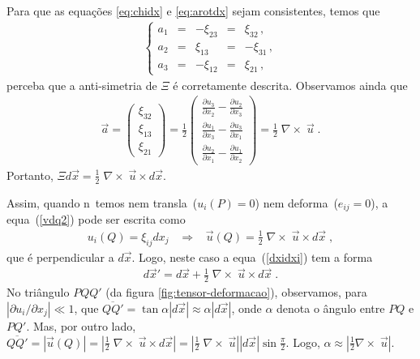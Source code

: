 Para que as equa\c{c}\~oes \ref{eq:chidx} e \ref{eq:arotdx} sejam consistentes, temos que
\begin{eqnarray}
\left\{
\begin{array}{ccccc}
a_1 & = & -\xi_{23} & = & \xi_{32} \, , \\
a_2 & = & \xi_{13} & = & -\xi_{31}\, ,  \\
a_3 & = & -\xi_{12} & = & \xi_{21} \, ,
\end{array} \right.
\end{eqnarray}
perceba que a anti-simetria de $\Xi$ \'e corretamente descrita.
Observamos ainda que
\begin{eqnarray}
\vec{a} = \left(
\begin{array}{c}
\xi_{32} \\
\xi_{13} \\
\xi_{21}
\end{array} \right)
= \frac{1}{2}  \left(
\begin{array}{c}
\frac{\partial u_3}{\partial x_2}-\frac{\partial u_2}
{\partial x_3}\\
\frac{\partial u_1}{\partial x_3}-\frac{\partial u_3}
{\partial x_1}\\
\frac{\partial u_2}{\partial x_1}-\frac{\partial u_1}
{\partial x_2}
\end{array} \right)
= \frac{1}{2} \; \nabla \times \; \vec{u} \; .
\end{eqnarray}
Portanto, $\Xi d\vec{x} = \frac{1}{2} \; \nabla \times
\;\vec{u} \times d\vec{x}$.

Assim, quando n\ao\ temos nem transla\cao\ ($u_i(P)=0$) nem deforma\cao\
($e_{ij}=0$), a equa\cao\ (\ref{vdq2}) pode ser escrita como
\begin{eqnarray}
u_i(Q) = \xi_{ij} dx_j \; \; \; \Longrightarrow \; \; \;
\vec{u}(Q) = \frac{1}{2} \;\nabla \times \; \vec{u}\times
d\vec{x} \; ,
\end{eqnarray}
que \'e perpendicular a $d\vec{x}$.
Logo, neste caso a equa\cao\ (\ref{dxidxi})
tem a forma
\begin{eqnarray}
  d\vec{x}' = d\vec{x} + \frac{1}{2} \;\nabla \times \; \vec{u}\times
d\vec{x} \; .
\end{eqnarray}
No tri\^angulo $PQQ'$ (da figura \ref{fig:tensor-deformacao}), observamos, para $|\partial u_i/\partial x_j|\ll 1$,
que $\overline{QQ'} = \tan \alpha |d\vec{x}| \approx
\alpha |d\vec{x}|$, onde $\alpha$ denota o \^angulo entre $PQ$ e $PQ'$.
Mas, por outro lado, $\overline{QQ'} = |\vec{u}(Q)|=
\mbox{$|\frac{1}{2} \; \nabla \times \; \vec{u} \times
d\vec{x}|$} = |\frac{1}{2} \; \nabla \times \; \vec{u}|
|d\vec{x}| \sin \frac{\pi}{2}$. Logo, $\alpha \approx
|\frac{1}{2} \nabla \times \; \vec{u}|$. 

